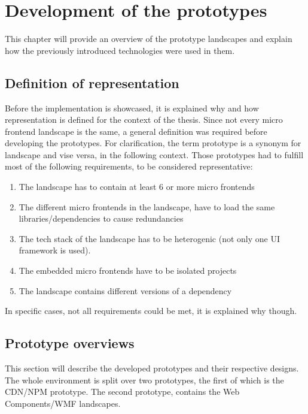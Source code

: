 \chapter{Development of the prototypes} %
\label{Chapter6}


This chapter will provide an overview of the prototype landscapes and explain how the previously introduced technologies were used in them.

\section{Definition of representation}

Before the implementation is showcased, it is explained why and how representation is defined for the context of the thesis.
Since not every micro frontend landscape is the same, a general definition was required before developing the prototypes.
For clarification, the term prototype is a synonym for landscape and vise versa, in the following context.
Those prototypes had to fulfill most of the following requirements, to be considered representative:

\begin{enumerate}
	\item The landscape has to contain at least 6 or more micro frontends
	\item The different micro frontends in the landscape, have to load the same libraries/dependencies to cause redundancies
	\item The tech stack of the landscape has to be heterogenic (not only one UI framework is used).
	\item The embedded micro frontends have to be isolated projects
	\item The landscape contains different versions of a dependency
\end{enumerate}

In specific cases, not all requirements could be met, it is explained why though.

\section{Prototype overviews}

This section will describe the developed prototypes and their respective designs. The whole environment is split over two prototypes, the first of which is the CDN/NPM prototype.
The second prototype, contains the Web Components/WMF landscapes.

